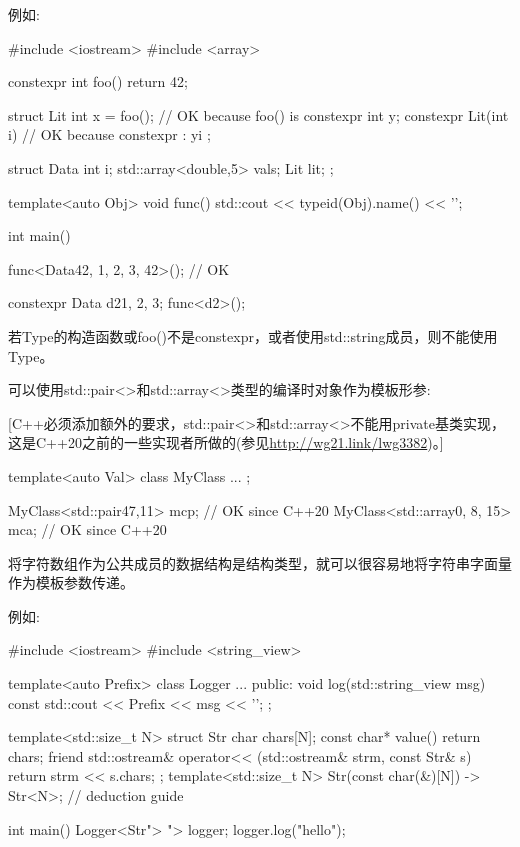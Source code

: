 例如:


\begin{cpp}
#include <iostream>
#include <array>

constexpr int foo()
{
	return 42;
}

struct Lit {
	int x = foo(); // OK because foo() is constexpr
	int y;
	constexpr Lit(int i) // OK because constexpr
		: y{i} {
	}
};

struct Data {
	int i;
	std::array<double,5> vals;
	Lit lit;
};

template<auto Obj>
void func()
{
	std::cout << typeid(Obj).name() << '\n';
}

int main()
{
	func<Data{42, {1, 2, 3}, 42}>(); // OK

	constexpr Data d2{1, {2}, 3};
	func<d2>();
}
\end{cpp}

若Type的构造函数或foo()不是constexpr，或者使用std::string成员，则不能使用Type。


可以使用std::pair<>和std::array<>类型的编译时对象作为模板形参:

[C++必须添加额外的要求，std::pair<>和std::array<>不能用private基类实现，这是C++20之前的一些实现者所做的(参见\url{http://wg21.link/lwg3382})。]

\begin{cpp}
template<auto Val>
class MyClass {
	...
};

MyClass<std::pair{47,11}> mcp; // OK since C++20
MyClass<std::array{0, 8, 15}> mca; // OK since C++20
\end{cpp}


将字符数组作为公共成员的数据结构是结构类型，就可以很容易地将字符串字面量作为模板参数传递。

例如:


\begin{cpp}
#include <iostream>
#include <string_view>

template<auto Prefix>
class Logger {
	...
public:
	void log(std::string_view msg) const {
		std::cout << Prefix << msg << '\n';
	}
};

template<std::size_t N>
struct Str {
	char chars[N];
	const char* value() {
		return chars;
	}
	friend std::ostream& operator<< (std::ostream& strm, const Str& s) {
		return strm << s.chars;
	}
};
template<std::size_t N> Str(const char(&)[N]) -> Str<N>; // deduction guide

int main()
{
	Logger<Str{"> "}> logger;
	logger.log("hello");
}
\end{cpp}

